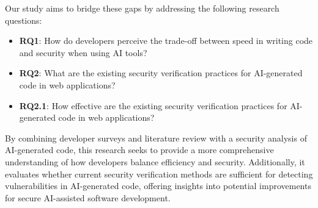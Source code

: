 Our study aims to bridge these gaps by addressing the following research questions:
\begin{itemize}
	\item \textbf{RQ1}: How do developers perceive the trade-off between speed in writing code and security when using AI tools?
	\item \textbf{RQ2}: What are the existing security verification practices for AI-generated code in web applications?
	\item \textbf{RQ2.1}: How effective are the existing security verification practices for AI-generated code in web applications?
\end{itemize}

By combining developer surveys and literature review with a security analysis of AI-generated code, this research seeks to provide a more comprehensive understanding of how developers balance efficiency and security. Additionally, it evaluates whether current security verification methods are sufficient for detecting vulnerabilities in AI-generated code, offering insights into potential improvements for secure AI-assisted software development.
